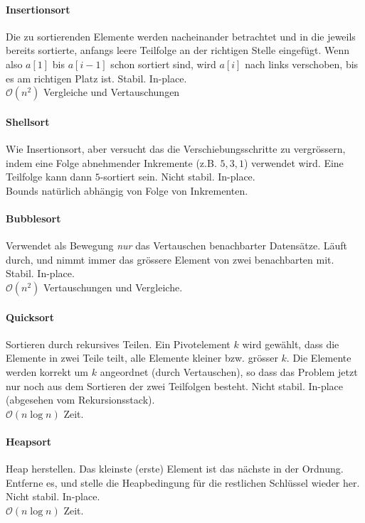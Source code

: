\documentclass[a4paper, 9pt, DIV=20]{scrartcl}
\newcommand{\Oh}{\mathcal{O}}
\begin{document}
\paragraph{Insertionsort} Die zu sortierenden Elemente werden nacheinander betrachtet und in die jeweils bereits sortierte, anfangs leere Teilfolge an der richtigen Stelle eingefügt. Wenn also $a[1]$ bis $a[i-1]$ schon sortiert sind, wird $a[i]$ nach links verschoben, bis es am richtigen Platz ist. Stabil. In-place.\\
$\Oh(n^{2})$ Vergleiche und Vertauschungen

\paragraph{Shellsort} Wie Insertionsort, aber versucht das die Verschiebungsschritte zu vergrössern, indem eine Folge abnehmender Inkremente (z.B. $5,3,1$) verwendet wird. Eine Teilfolge kann dann $5$-sortiert sein. Nicht stabil. In-place. \\
Bounds natürlich abhängig von Folge von Inkrementen.

\paragraph{Bubblesort} Verwendet als Bewegung \emph{nur} das Vertauschen benachbarter Datensätze. Läuft durch, und nimmt immer das grössere Element von zwei benachbarten mit. Stabil. In-place. \\
$\Oh(n^{2})$ Vertauschungen und Vergleiche.

\paragraph{Quicksort} Sortieren durch rekursives Teilen. Ein Pivotelement $k$ wird gewählt, dass die Elemente in zwei Teile teilt, alle Elemente kleiner bzw. grösser $k$. Die Elemente werden korrekt um $k$ angeordnet (durch Vertauschen), so dass das Problem jetzt nur noch aus dem Sortieren der zwei Teilfolgen besteht. Nicht stabil. In-place (abgesehen vom Rekursionsstack). \\
$\Oh(n\log{n})$ Zeit.

\paragraph{Heapsort} Heap herstellen. Das kleinste (erste) Element ist das nächste in der Ordnung. Entferne es, und stelle die Heapbedingung für die restlichen Schlüssel wieder her. Nicht stabil. In-place. \\
$\Oh(n\log{n})$ Zeit.
\end{document}
